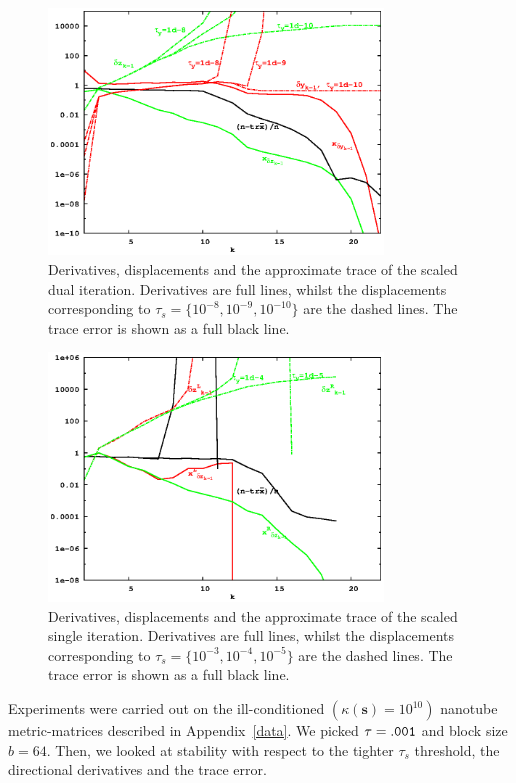 \documentclass[letterpaper,twocolumn,amsmath,amsfont,amssymb,english,aps,jcp,preprintnumbers,groupaddress,nofootinbib,tightenlines,floatfix]{revtex4}
\newcommand{\mat}[1]{\boldsymbol{#1}}
\theoremstyle{plain}
\theoremstyle{remark}
\theoremstyle{plain}
\begin{document}
\begin{figure}[h] 
\includegraphics[width=3.5in]{fig_33_tube_cond_10_scaled_33_tube_k10_scale_dual.eps}
\caption{Derivatives, displacements and the approximate trace of the scaled dual iteration.
Derivatives are full lines, whilst the displacements corresponding to $\tau_s=\{10^{-8}, 10^{-9}, 10^{-10}\}$
are the dashed lines.  The trace error is shown as a full black line. }\label{flow_scaled_dual}
\end{figure}

\begin{figure}[h]
\includegraphics[width=3.5in]{fig_33_tube_cond_10_scaled_33_tube_k10_scale_stab.eps}
\caption{Derivatives, displacements and the approximate trace of the scaled single iteration.
Derivatives are full lines, whilst the displacements corresponding to $\tau_s=\{10^{-3}, 10^{-4}, 10^{-5}\}$
are the dashed lines.  The trace error is shown as a full black line. }\label{flow_scaled_stab}
\end{figure}

Experiments were carried out on the ill-conditioned $(\kappa(\mat{s})=10^{10})$ nanotube metric-matrices described in Appendix~\ref{data}.
We picked  $\tau ={\tt .001}$ and block size $b = 64$.  Then, we looked at stability with respect to the tighter $\tau_s$ threshold, 
the directional derivatives and the trace error.   
\end{document}
